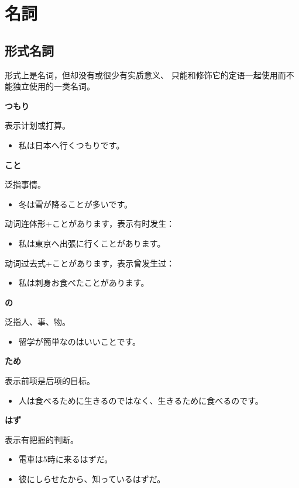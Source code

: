 \section{名詞}%

\subsection{形式名詞}%

形式上是名词，但却没有或很少有实质意义、
只能和修饰它的定语一起使用而不能独立使用的一类名词。

{\bf
\noindent つもり
}

表示计划或打算。
\begin{itemize}
  \item 私は日本へ行くつもりです。
\end{itemize}

{\bf
\noindent こと
}

泛指事情。
\begin{itemize}
  \item 冬は雪が降ることが多いです。
\end{itemize}

动词连体形+ことがあります，表示有时发生：
\begin{itemize}
  \item 私は東京へ出張に行くことがあります。
\end{itemize}

动词过去式+ことがあります，表示曾发生过：
\begin{itemize}
  \item 私は刺身お食べたことがあります。
\end{itemize}

{\bf
\noindent の
}

泛指人、事、物。
\begin{itemize}
  \item 留学が簡単なのはいいことです。
\end{itemize}

{\bf
\noindent ため
}

表示前项是后项的目标。
\begin{itemize}
  \item 人は食べるために生きるのではなく、生きるために食べるのです。
\end{itemize}

{\bf
\noindent はず
}

表示有把握的判断。
\begin{itemize}
  \item 電車は5時に来るはずだ。
  \item 彼にしらせたから、知っているはずだ。
\end{itemize}
